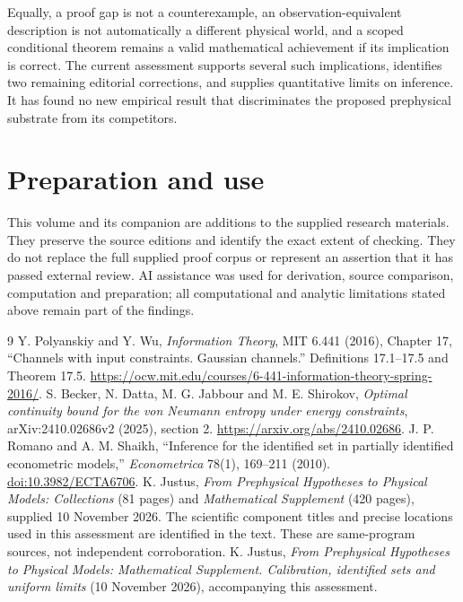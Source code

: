 \documentclass[11pt,a4paper]{article}
\begin{document}
Equally, a proof gap is not a counterexample, an observation-equivalent description is not automatically a different physical world, and a scoped conditional theorem remains a valid mathematical achievement if its implication is correct. The current assessment supports several such implications, identifies two remaining editorial corrections, and supplies quantitative limits on inference. It has found no new empirical result that discriminates the proposed prephysical substrate from its competitors.

\section*{Preparation and use}
This volume and its companion are additions to the supplied research materials. They preserve the source editions and identify the exact extent of checking. They do not replace the full supplied proof corpus or represent an assertion that it has passed external review. AI assistance was used for derivation, source comparison, computation and preparation; all computational and analytic limitations stated above remain part of the findings.

\begin{thebibliography}{9}
 Y. Polyanskiy and Y. Wu, \emph{Information Theory}, MIT 6.441 (2016), Chapter 17, “Channels with input constraints. Gaussian channels.” Definitions 17.1–17.5 and Theorem 17.5. \url{https://ocw.mit.edu/courses/6-441-information-theory-spring-2016/}.
 S. Becker, N. Datta, M. G. Jabbour and M. E. Shirokov, \emph{Optimal continuity bound for the von Neumann entropy under energy constraints}, arXiv:2410.02686v2 (2025), section 2. \url{https://arxiv.org/abs/2410.02686}.
 J. P. Romano and A. M. Shaikh, “Inference for the identified set in partially identified econometric models,” \emph{Econometrica} 78(1), 169–211 (2010). \href{https://doi.org/10.3982/ECTA6706}{doi:10.3982/ECTA6706}.
 K. Justus, \emph{From Prephysical Hypotheses to Physical Models: Collections} (81 pages) and \emph{Mathematical Supplement} (420 pages), supplied 10 November 2026. The scientific component titles and precise locations used in this assessment are identified in the text. These are same-program sources, not independent corroboration.
 K. Justus, \emph{From Prephysical Hypotheses to Physical Models: Mathematical Supplement. Calibration, identified sets and uniform limits} (10 November 2026), accompanying this assessment.
\end{thebibliography}
\clearpage
{}

\end{document}
